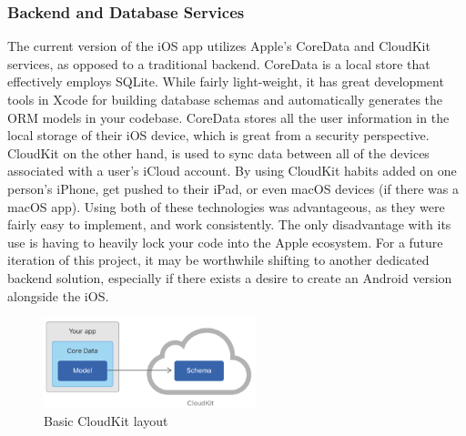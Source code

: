 \subsubsection{Backend and Database Services}
The current version of the iOS app utilizes Apple’s CoreData and CloudKit services, as opposed to a traditional backend. CoreData is a local store that effectively employs SQLite. While fairly light-weight, it has great development tools in Xcode for building database schemas and automatically generates the ORM models in your codebase. CoreData stores all the user information in the local storage of their iOS device, which is great from a security perspective. CloudKit on the other hand, is used to sync data between all of the devices associated with a user’s iCloud account. By using CloudKit habits added on one person’s iPhone, get pushed to their iPad, or even macOS devices (if there was a macOS app). Using both of these technologies was advantageous, as they were fairly easy to implement, and work consistently. The only disadvantage with its use is having to heavily lock your code into the Apple ecosystem. For a future iteration of this project, it may be worthwhile shifting to another dedicated backend solution, especially if there exists a desire to create an Android version alongside the iOS.
\begin{figure}[h]
\centering
\includegraphics[width=0.55\textwidth]{images/cloudkit.png}
\caption{Basic CloudKit layout}
\end{figure}
